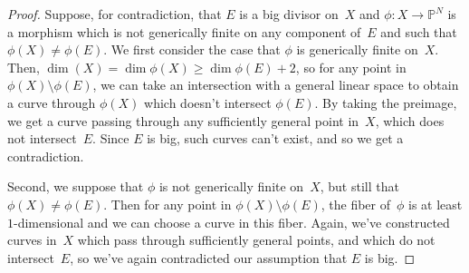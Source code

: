 \documentclass[11pt]{amsart}
\theoremstyle{definition}
\newcommand{\PP}{\mathbb P}
\begin{document}
\begin{proof}
Suppose, for contradiction, that $E$ is a big divisor on~$X$ and $\phi\colon X
\rightarrow \PP^N$ is a morphism which is not generically finite on any
component of~$E$ and such that $\phi(X) \neq \phi(E)$. We first
consider the case that $\phi$ is generically finite on~$X$. Then, $\dim(X) =
\dim\phi(X) \geq \dim \phi(E) + 2$, so for any point in $\phi(X) \setminus
\phi(E)$, we can take an intersection with a general linear space to obtain
a curve through $\phi(X)$ which doesn't intersect
$\phi(E)$. By taking the preimage, we get a curve passing through any
sufficiently general point in~$X$, which does not intersect~$E$. Since $E$ is
big, such curves can't exist, and so we get a contradiction.

Second, we suppose that $\phi$ is not generically finite on~$X$, but still that
$\phi(X) \neq \phi(E)$. Then for any point in $\phi(X) \setminus \phi(E)$, the
fiber of~$\phi$ is at least $1$-dimensional and we can choose a curve in this
fiber. Again, we've constructed curves in~$X$ which pass through sufficiently
general points, and which do not intersect~$E$, so we've again contradicted our
assumption that $E$ is big.
\end{proof}
\end{document}
